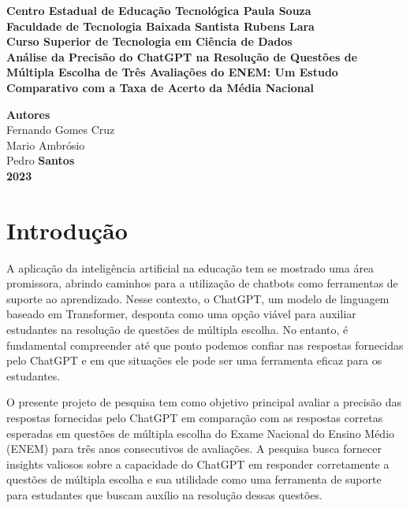 \documentclass[12pt, a4paper]{article}
\begin{document}
\begin{titlepage}
\begin{center}
    \large
     {\bf Centro Estadual de Educação Tecnológica Paula Souza} \\
     {\bf Faculdade de Tecnologia Baixada Santista
Rubens Lara} \\ 
    {\bf Curso Superior de Tecnologia em Ciência de Dados} \\
    
    \vspace{215pt}
    \vspace{10pt}
        {\Large \bf Análise da Precisão do ChatGPT na Resolução de Questões de Múltipla Escolha de Três Avaliações do ENEM: Um Estudo Comparativo com a Taxa de Acerto da Média Nacional}\\
        
    \vspace{100pt}

    \vfill
        {\large  \bf Autores} \\
        {\large   Fernando Gomes Cruz\\Mario Ambrósio\\Pedro}
    \vfill
        \textbf{{\large Santos}\\
        {\large 2023}}
        
\end{center}
\end{titlepage}

\tableofcontents

\newpage

\section{Introdução}
A aplicação da inteligência artificial na educação tem se mostrado uma área promissora, abrindo caminhos para a utilização de chatbots como ferramentas de suporte ao aprendizado. Nesse contexto, o ChatGPT, um modelo de linguagem baseado em Transformer, desponta como uma opção viável para auxiliar estudantes na resolução de questões de múltipla escolha. No entanto, é fundamental compreender até que ponto podemos confiar nas respostas fornecidas pelo ChatGPT e em que situações ele pode ser uma ferramenta eficaz para os estudantes.

O presente projeto de pesquisa tem como objetivo principal avaliar a precisão das respostas fornecidas pelo ChatGPT em comparação com as respostas corretas esperadas em questões de múltipla escolha do Exame Nacional do Ensino Médio (ENEM) para três anos consecutivos de avaliações. A pesquisa busca fornecer insights valiosos sobre a capacidade do ChatGPT em responder corretamente a questões de múltipla escolha e sua utilidade como uma ferramenta de suporte para estudantes que buscam auxílio na resolução dessas questões.
\end{document}
